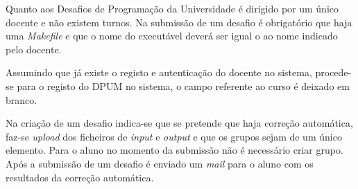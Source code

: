 Quanto aos Desafios de Programação da Universidade é dirigido por um único docente e não existem turnos. Na submissão de um desafio é obrigatório que haja uma \emph{Makefile} e que o nome do executável deverá ser igual o ao nome indicado pelo docente.

Assumindo que já existe o registo e autenticação do docente no sistema, procede-se para o registo do DPUM no sistema, o campo referente ao curso é deixado em branco.

Na criação de um desafio indica-se que se pretende que haja correção automática, faz-se \emph{upload} dos ficheiros de \emph{input} e \emph{output} e que os grupos sejam de um único elemento. Para o aluno no momento da submissão não é necessário criar grupo. Após a submissão de um desafio é enviado um \emph{mail} para o aluno com os resultados da correção automática.





